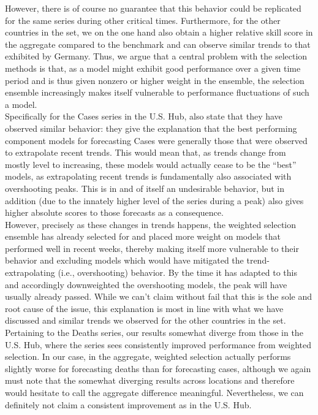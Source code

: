 However, there is of course no guarantee that this behavior could be replicated for the same series during other critical times. Furthermore, for the other countries in the set, we on the one hand also obtain a higher relative skill score in the aggregate compared to the benchmark and can observe similar trends to that exhibited by Germany. Thus, we argue that a central problem with the selection methods is that, as a model might exhibit good performance over a given time period and is thus given nonzero or higher weight in the ensemble, the selection ensemble increasingly makes itself vulnerable to performance fluctuations of such a model.\\ 
Specifically for the Cases series in the U.S. Hub, \cite{ray_comparing_2022} also state that they have observed similar behavior: they give the explanation that the best performing component models for forecasting Cases were generally those that were observed to extrapolate recent trends. This would mean that, as trends change from mostly level to increasing, these models would actually cease to be the ``best'' models, as extrapolating recent trends is fundamentally also associated with overshooting peaks. This is in and of itself an undesirable behavior, but in addition (due to the innately higher level of the series during a peak) also gives higher absolute scores to those forecasts as a consequence.\\
However, precisely as these changes in trends happens, the weighted selection ensemble has already selected for and placed more weight on models that performed well in recent weeks, thereby making itself more vulnerable to their behavior and excluding models which would have mitigated the trend-extrapolating (i.e., overshooting) behavior. By the time it has adapted to this and accordingly downweighted the overshooting models, the peak will have usually already passed. While we can't claim without fail that this is the sole and root cause of the issue, this explanation is most in line with what we have discussed and similar trends we observed for the other countries in the set.\medskip\\
Pertaining to the Deaths series, our results somewhat diverge from those in the U.S. Hub, where the series sees consistently improved performance from weighted selection. In our case, in the aggregate, weighted selection actually performs slightly worse for forecasting deaths than for forecasting cases, although we again must note that the somewhat diverging results across locations and therefore would hesitate to call the aggregate difference meaningful. Nevertheless, we can definitely not claim a consistent improvement as in the U.S. Hub.\\
